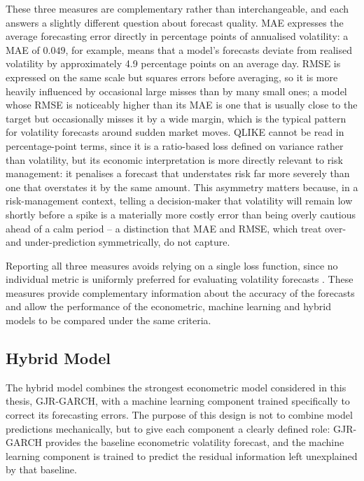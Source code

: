 \documentclass[12pt,a4paper]{article}
\begin{document}
These three measures are complementary rather than interchangeable, and each answers a slightly
different question about forecast quality. MAE expresses the average forecasting error directly in
percentage points of annualised volatility: a MAE of $0.049$, for example, means that a model's
forecasts deviate from realised volatility by approximately 4.9 percentage points on an average day.
RMSE is expressed on the same scale but squares errors before averaging, so it is more heavily
influenced by occasional large misses than by many small ones; a model whose RMSE is noticeably
higher than its MAE is one that is usually close to the target but occasionally misses it by a wide
margin, which is the typical pattern for volatility forecasts around sudden market moves. QLIKE
cannot be read in percentage-point terms, since it is a ratio-based loss defined on variance rather
than volatility, but its economic interpretation is more directly relevant to risk management: it
penalises a forecast that understates risk far more severely than one that overstates it by the same
amount. This asymmetry matters because, in a risk-management context, telling a decision-maker that
volatility will remain low shortly before a spike is a materially more costly error than being overly
cautious ahead of a calm period -- a distinction that MAE and RMSE, which treat over- and
under-prediction symmetrically, do not capture.

Reporting all three measures avoids relying on a single loss function, since no individual metric is
uniformly preferred for evaluating volatility forecasts \citep{poon2003}. These measures provide
complementary information about the accuracy of the forecasts and allow the performance of the
econometric, machine learning and hybrid models to be compared under the same criteria.

\subsection{Hybrid Model}\label{sec:hybrid}

The hybrid model combines the strongest econometric model considered in this thesis, GJR-GARCH,
with a machine learning component trained specifically to correct its forecasting errors. The
purpose of this design is not to combine model predictions mechanically, but to give each component
a clearly defined role: GJR-GARCH provides the baseline econometric volatility forecast, and the
machine learning component is trained to predict the residual information left unexplained by that
baseline.
\end{document}

